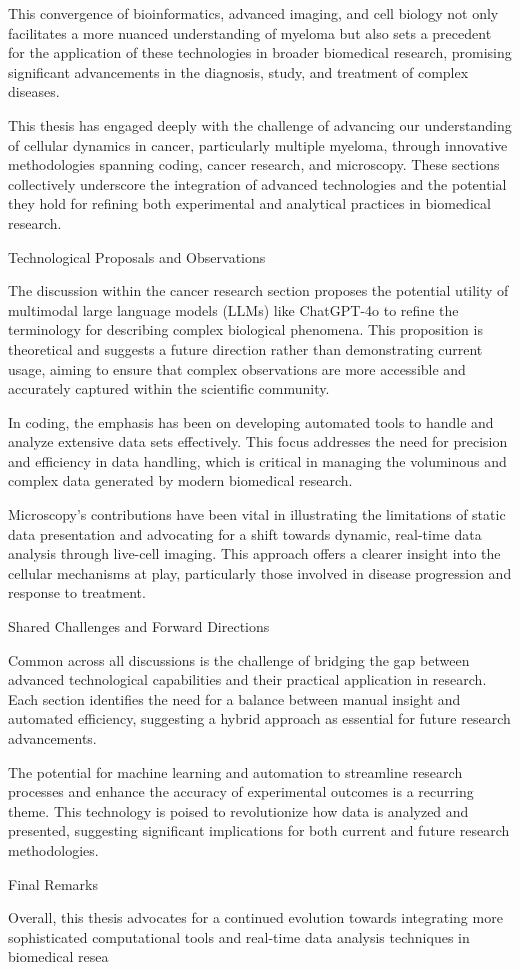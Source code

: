 This convergence of bioinformatics, advanced imaging, and cell biology not only
facilitates a more nuanced understanding of myeloma but also sets a precedent
for the application of these technologies in broader biomedical research,
promising significant advancements in the diagnosis, study, and treatment of
complex diseases.







This thesis has engaged deeply with the challenge of advancing our understanding
of cellular dynamics in cancer, particularly multiple myeloma, through
innovative methodologies spanning coding, cancer research, and microscopy. These
sections collectively underscore the integration of advanced technologies and
the potential they hold for refining both experimental and analytical practices
in biomedical research.

Technological Proposals and Observations

The discussion within the cancer research section proposes the potential utility
of multimodal large language models (LLMs) like ChatGPT-4o to refine the
terminology for describing complex biological phenomena. This proposition is
theoretical and suggests a future direction rather than demonstrating current
usage, aiming to ensure that complex observations are more accessible and
accurately captured within the scientific community.

In coding, the emphasis has been on developing automated tools to handle and
analyze extensive data sets effectively. This focus addresses the need for
precision and efficiency in data handling, which is critical in managing the
voluminous and complex data generated by modern biomedical research.

Microscopy’s contributions have been vital in illustrating the limitations of
static data presentation and advocating for a shift towards dynamic, real-time
data analysis through live-cell imaging. This approach offers a clearer insight
into the cellular mechanisms at play, particularly those involved in disease
progression and response to treatment.

Shared Challenges and Forward Directions

Common across all discussions is the challenge of bridging the gap between
advanced technological capabilities and their practical application in research.
Each section identifies the need for a balance between manual insight and
automated efficiency, suggesting a hybrid approach as essential for future
research advancements.

The potential for machine learning and automation to streamline research
processes and enhance the accuracy of experimental outcomes is a recurring
theme. This technology is poised to revolutionize how data is analyzed and
presented, suggesting significant implications for both current and future
research methodologies.

Final Remarks

Overall, this thesis advocates for a continued evolution towards integrating
more sophisticated computational tools and real-time data analysis techniques in
biomedical resea